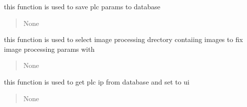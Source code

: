 \documentclass[letterpaper,10pt,english]{sphinxmanual}
\begin{document}
\begin{savenotes}
\begin{fulllineitems}

\begin{savenotes}\begin{fulllineitems}
\label{\detokenize{setting/setting_api:oxin.setting_api.API.save_plc_parms}}
\pysigstartsignatures
{}
\pysigstopsignatures
\sphinxAtStartPar
this function is used to save plc params to database
\begin{quote}\begin{description}
\sphinxAtStartPar
None

\end{description}\end{quote}

\end{fulllineitems}\end{savenotes}


\begin{savenotes}\begin{fulllineitems}
\label{\detokenize{setting/setting_api:oxin.setting_api.API.select_image_procesing_directory}}
\pysigstartsignatures
{}
\pysigstopsignatures
\sphinxAtStartPar
this function is used to select image processing drectory contaiing images to fix image processing params with
\begin{quote}\begin{description}
\sphinxAtStartPar
None

\end{description}\end{quote}

\end{fulllineitems}\end{savenotes}


\begin{savenotes}\begin{fulllineitems}
\label{\detokenize{setting/setting_api:oxin.setting_api.API.set_plc_ip_to_ui}}
\pysigstartsignatures
{}
\pysigstopsignatures
\sphinxAtStartPar
this function is used to get plc ip from database and set to ui
\begin{quote}\begin{description}
\sphinxAtStartPar
None


\end{description}
\end{quote}
\end{fulllineitems}
\end{savenotes}
\end{fulllineitems}
\end{savenotes}
\end{document}

